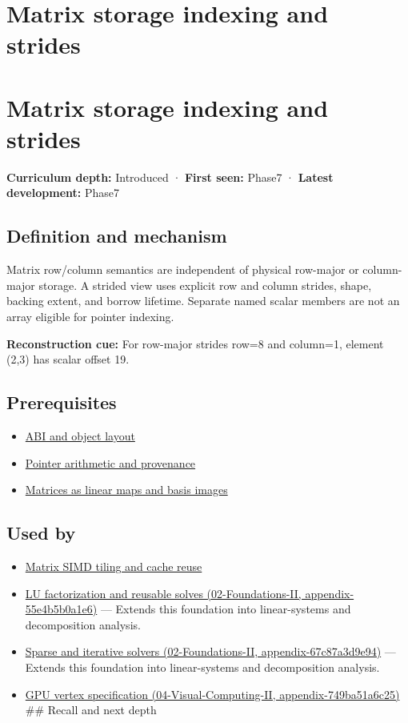 \hypertarget{appendix-ffdc1d4e5350}{}
\section*{Matrix storage indexing and strides}
\section{Matrix storage indexing and strides}\label{matrix-storage-indexing-and-strides}

\textbf{Curriculum depth:} Introduced · \textbf{First seen:} Phase7 · \textbf{Latest development:} Phase7

\subsection{Definition and mechanism}\label{definition-and-mechanism}

Matrix row/column semantics are independent of physical row-major or column-major storage. A strided view uses explicit row and column strides, shape, backing extent, and borrow lifetime. Separate named scalar members are not an array eligible for pointer indexing.

\textbf{Reconstruction cue:} For row-major strides row=8 and column=1, element (2,3) has scalar offset 19.

\subsection{Prerequisites}\label{prerequisites}

\begin{itemize}
\tightlist
\item
  \hyperref[appendix-c4ac6bb0fff8]{ABI and object layout}
\item
  \hyperref[appendix-6af5921bc853]{Pointer arithmetic and provenance}
\item
  \hyperref[appendix-bd39c3bf5d64]{Matrices as linear maps and basis images}
\end{itemize}

\subsection{Used by}\label{used-by}

\begin{itemize}
\item
  \hyperref[appendix-1bfb7c657105]{Matrix SIMD tiling and cache reuse}
\item
  \href{}{LU factorization and reusable solves (02-Foundations-II, appendix-55e4b5b0a1e6)} --- Extends this foundation into linear-systems and decomposition analysis.
\item
  \href{}{Sparse and iterative solvers (02-Foundations-II, appendix-67c87a3d9e94)} --- Extends this foundation into linear-systems and decomposition analysis.
\item
  \href{}{GPU vertex specification (04-Visual-Computing-II, appendix-749ba51a6c25)} \#\# Recall and next depth
\end{itemize}

